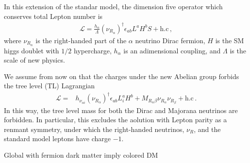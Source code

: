 \documentclass[12pt]{article}
\begin{document}
In this extension of the standar model, the dimension five operator which conserves total Lepton number is~\cite{}
\begin{align}
  \mathcal{L}=
  \frac{h_{\alpha}}{\Lambda} (\nu_{R_\alpha})^\dagger \epsilon_{ab}L^a H^b S + \text{h.c}\,,
\end{align}
where $\nu_{R_\alpha}$ is the right-handed part of  the $\alpha$ neutrino Dirac fermion, $H$ is the SM higgs doublet with $1/2$ hypercharge,
$h_{\alpha}$ is an adimensional coupling, and $\Lambda$ is the scale of new physics.

We assume from now on that the charges under the new Abelian group forbids the tree level (TL) Lagrangian
\begin{align}
 \mathcal{L}= & h_{\nu_{\alpha i}}(\nu_{R_\alpha})^\dagger \epsilon_{ab}L^a_i H^b+M_{R_\alpha\beta}
  \nu_{R_\alpha} \nu_{R_\beta}+
  \text{h.c}\,.
\end{align}
In this way,  the tree level mass for both the Dirac and Majorana neutrinos are forbidden. In particular, this excludes the aolution with Lepton parity as a renmant symmetry, under which the right-handed neutrinos, $\nu_R$, and the standard model leptons have charge $-1$.



Global with fermion dark matter imply colored DM
\end{document}
